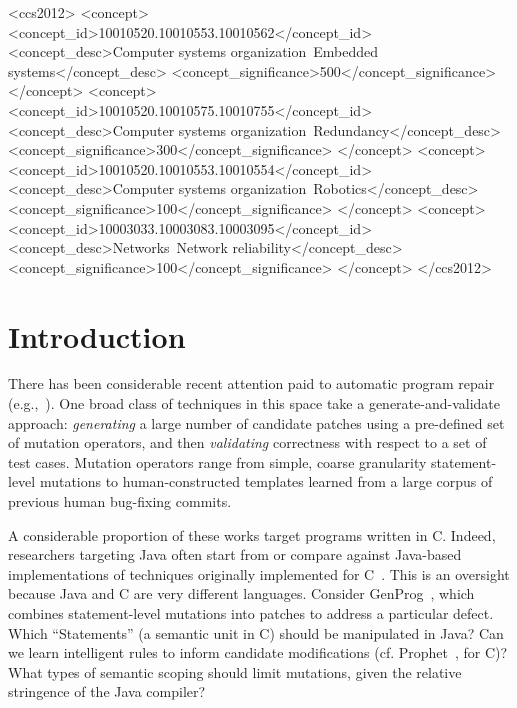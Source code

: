 \documentclass{sig-alternate-05-2015}
\begin{document}
%
%
\begin{CCSXML}
<ccs2012>
 <concept>
  <concept_id>10010520.10010553.10010562</concept_id>
  <concept_desc>Computer systems organization~Embedded systems</concept_desc>
  <concept_significance>500</concept_significance>
 </concept>
 <concept>
  <concept_id>10010520.10010575.10010755</concept_id>
  <concept_desc>Computer systems organization~Redundancy</concept_desc>
  <concept_significance>300</concept_significance>
 </concept>
 <concept>
  <concept_id>10010520.10010553.10010554</concept_id>
  <concept_desc>Computer systems organization~Robotics</concept_desc>
  <concept_significance>100</concept_significance>
 </concept>
 <concept>
  <concept_id>10003033.10003083.10003095</concept_id>
  <concept_desc>Networks~Network reliability</concept_desc>
  <concept_significance>100</concept_significance>
 </concept>
</ccs2012>  
\end{CCSXML}


%
%

%
%
\printccsdesc



\section{Introduction}

There has been considerable recent attention paid to automatic
program repair (e.g.,~\cite{kim2013,legoues2012,
  Mechtaev15,Long2016}).
%
One broad class of techniques in this space take a generate-and-validate
approach: \emph{generating} a large number of candidate patches using a
pre-defined set of mutation operators, and then \emph{validating} correctness with
respect to a set of test cases.  Mutation operators range from simple, coarse
granularity statement-level mutations to human-constructed templates learned
from a large corpus of previous human bug-fixing commits.

A considerable proportion of these works target programs written in C.
Indeed, researchers targeting Java often start from or compare against
Java-based implementations of techniques originally
implemented for C~\cite{nopol,kim2013}. %
%
This is an oversight because Java and C are very different languages.
Consider GenProg~\cite{legoues2012}, which
combines statement-level mutations into patches to address a particular
defect. Which ``Statements'' (a semantic unit in C) should be manipulated in Java?
Can we learn
intelligent rules to inform candidate modifications
(cf. Prophet~\cite{Long2016}, for C)?  What types of semantic scoping
should limit mutations, given the relative stringence of the Java
compiler?
\end{document}
